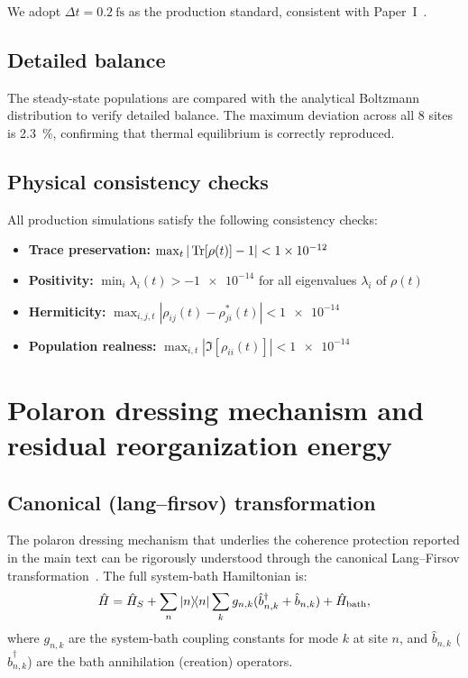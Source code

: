 \documentclass[11pt,a4paper]{article}
\begin{document}
We adopt $\Delta t = \qty{0.2}{\fs}$ as the production standard, consistent with Paper~I~\cite{Kouam2026}.

\subsection{Detailed balance}

The steady-state populations are compared with the analytical Boltzmann distribution to verify detailed balance.
The maximum deviation across all 8 sites is \qty{2.3}{\percent}, confirming that thermal equilibrium is correctly reproduced.

\subsection{Physical consistency checks}

All production simulations satisfy the following consistency checks:
\begin{itemize}
\item \textbf{Trace preservation:} $\max_t |\Tr[\rho(t)] - 1| < \num{1e-12}$
\item \textbf{Positivity:} $\min_i \lambda_i(t) > -\num{1e-14}$ for all eigenvalues $\lambda_i$ of $\rho(t)$
\item \textbf{Hermiticity:} $\max_{i,j,t} |\rho_{ij}(t) - \rho_{ji}^*(t)| < \num{1e-14}$
\item \textbf{Population realness:} $\max_{i,t} |\Im[\rho_{ii}(t)]| < \num{1e-14}$
\end{itemize}


\section{Polaron dressing mechanism and residual reorganization energy}
\label{SI-sec:polaron}

\subsection{Canonical (lang--firsov) transformation}

The polaron dressing mechanism that underlies the coherence protection reported in the main text can be rigorously understood through the canonical Lang--Firsov transformation~\cite{Chin2013,Huelga2013}.
The full system-bath Hamiltonian is:
\begin{equation}
\hat{H} = \hat{H}_S + \sum_n \dyad{n} \sum_k g_{n,k}(\hat{b}_{n,k}^\dagger + \hat{b}_{n,k}) + \hat{H}_{\mathrm{bath}},
\label{eq:SI_full_hamiltonian}
\end{equation}
where $g_{n,k}$ are the system-bath coupling constants for mode $k$ at site $n$, and $\hat{b}_{n,k}$ ($\hat{b}_{n,k}^\dagger$) are the bath annihilation (creation) operators.
\end{document}
